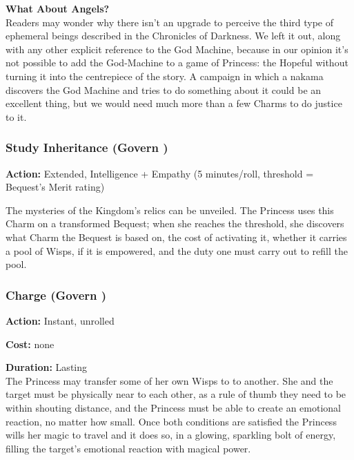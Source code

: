 \begin{mybox}

\noindent\textbf{What About Angels?} \\

\noindent Readers may wonder why there isn’t an upgrade to perceive the third type of ephemeral beings described in the Chronicles of Darkness. We left it out, along with any other explicit reference to the God Machine, because in our opinion it’s not possible to add the God-Machine to a game of Princess: the Hopeful without turning it into the centrepiece of the story. A campaign in which a nakama discovers the God Machine and tries to do something about it could be an excellent thing, but we would need much more than a few Charms to do justice to it.\end{mybox}


\subsubsection*{Study Inheritance (Govern \textbullet)}

\noindent \textbf{Action:} Extended, Intelligence + Empathy (5 minutes/roll, threshold = Bequest's Merit rating)

The mysteries of the Kingdom's relics can be unveiled. The Princess uses this Charm on a transformed Bequest; when she reaches the threshold, she discovers what Charm the Bequest is based on, the cost of activating it, whether it carries a pool of Wisps, if it is empowered, and the duty one must carry out to refill the pool.

\subsubsection*{Charge (Govern \textbullet\textbullet)}

\noindent \textbf{Action:} Instant, unrolled

\noindent \textbf{Cost:} none

\noindent \textbf{Duration:} Lasting \\

\noindent The Princess may transfer some of her own Wisps to to another. She and the target must be physically near to each other, as a rule of thumb they need to be within shouting distance, and the Princess must be able to create an emotional reaction, no matter how small. Once both conditions are satisfied the Princess wills her magic to travel and it does so, in a glowing, sparkling bolt of energy, filling the target's emotional reaction with magical power. 

